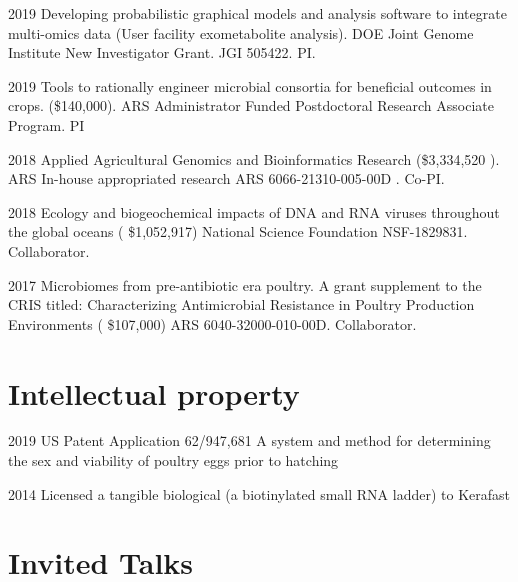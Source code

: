 \documentclass[12pt,letterpaper]{report}
\begin{document}
\begin{tablist}
        \item[2019] \tab  Developing probabilistic graphical models and analysis software to integrate multi-omics data (User facility exometabolite analysis). DOE Joint Genome Institute New Investigator Grant. JGI 505422. PI.
        \item[2019] \tab Tools to rationally engineer microbial consortia for beneficial outcomes in crops. (\$140,000). ARS Administrator Funded Postdoctoral Research Associate Program. PI
        \item[2018] \tab  Applied Agricultural Genomics and Bioinformatics Research  (\$3,334,520 ). ARS In-house appropriated research ARS 6066-21310-005-00D . Co-PI.
        \item[2018] \tab Ecology and biogeochemical impacts of DNA and RNA viruses throughout the global  oceans ( \$1,052,917)  National Science Foundation NSF-1829831. Collaborator.
        \item[2017] \tab Microbiomes from pre-antibiotic era poultry. A grant supplement to the CRIS titled: Characterizing Antimicrobial Resistance in Poultry Production Environments  ( \$107,000)  ARS 6040-32000-010-00D. Collaborator.

        
              
        
       \end{tablist} 
        
   \section*{Intellectual property}
          \begin{tablist}
           \item[2019]\tab US  Patent Application 62/947,681 A system and method for determining the sex and viability of poultry eggs prior to hatching\\
          \item[2014]\tab  Licensed a tangible biological (a biotinylated small RNA ladder) to Kerafast
          
          \end{tablist} 
    \section*{Invited Talks}
\end{document}
